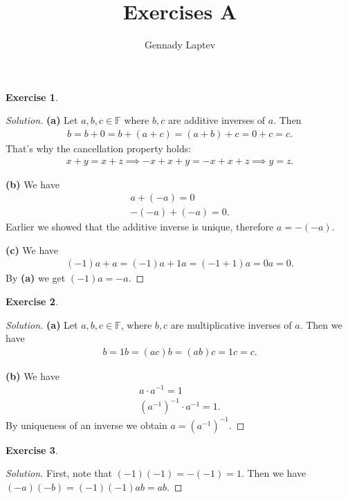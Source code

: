 \documentclass[letterpaper, 11pt, english]{article}
\title{Exercises A}
\author{Gennady Laptev}
\date{}
\theoremstyle{definition}
\theoremstyle{definition}
\newtheorem{problem}{Exercise}
\theoremstyle{definition}
\newenvironment{sol}{\begin{proof}[Solution]}{\end{proof}}
\theoremstyle{plain} %
\theoremstyle{plain} %
\theoremstyle{plain} %
\theoremstyle{plain} %
\theoremstyle{remark}
\begin{document}
\maketitle
\setcounter{section}{0}


\setcounter{problem}{0}
\begin{problem}
\begin{sol}
    \textbf{(a)} Let $ a, b, c \in \mathbb{F} $ where $ b, c $ are 
    additive inverses of $ a $. Then
    \begin{gather*}
        b = b + 0 = b + (a + c) = (a+b) + c = 0 + c = c.
    \end{gather*}
    That's why the cancellation property holds:
    \begin{gather*}
         x + y = x + z \implies -x + x +y = -x + x + z \implies y = z. 
    \end{gather*}
    
   \textbf{(b)} We have 
   \begin{gather*}
        a + (-a) = 0\\ 
        -(-a) + (-a) = 0.
   \end{gather*}
   Earlier we showed that the additive inverse is unique, therefore
   $ a = -(-a) $.

   \textbf{(c)} We have
   \begin{gather*}
       (-1)a + a = (-1)a + 1a = (-1 + 1)a = 0a = 0.
   \end{gather*}
   By \textbf{(a)} we get $ (-1)a = -a $.
\end{sol}
\end{problem}

\setcounter{problem}{1}
\begin{problem}
\begin{sol}
    \textbf{(a)} Let $ a, b, c \in \mathbb{F} $, where $ b,c $ are multiplicative inverses of 
    $ a $. Then we have
    \begin{gather*}
        b = 1b = (ac)b = (ab)c = 1c = c.
    \end{gather*}

   \textbf{(b)} We have
   \begin{gather*}
       a \cdot a^{-1} = 1 \\ 
       (a^{-1})^{-1} \cdot a^{-1} = 1.
   \end{gather*}
    By uniqueness of an inverse we obtain $ a =  (a^{-1})^{-1}$.   
\end{sol}
\end{problem}

\setcounter{problem}{2}
\begin{problem}
\begin{sol}
    First, note that $ (-1)(-1) = -(-1) = 1 $. Then we have
    $ (-a)(-b) = (-1)(-1)ab = ab$.
\end{sol}
\end{problem}
\end{document}
